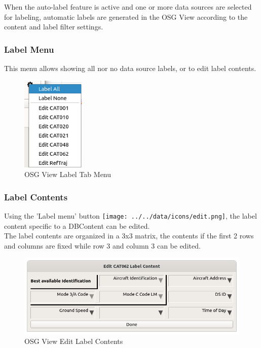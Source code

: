 When the auto-label feature is active and one or more data sources are selected for labeling, automatic labels are generated in the OSG View according to the content and label filter settings. \\

\subsubsection{Label Menu}

This menu allows showing all nor no data source labels, or to edit label contents.

\begin{figure}[H]
   \center
    \includegraphics[width=3cm,frame]{figures/osgview_label_tab_menu.png}
  \caption{OSG View Label Tab Menu}
\end{figure}

\subsubsection{Label Contents}

Using the 'Label menu' button \texttt{[image: ../../data/icons/edit.png]}, the label content specific to a DBContent can be edited. \\

The label contents are organized in a 3x3 matrix, the contents if the first 2 rows and columns are fixed while row 3 and column 3 can be edited. 

\begin{figure}[H]
   \center
    \includegraphics[width=14cm]{figures/osgview_label_content_edit.png}
  \caption{OSG View Edit Label Contents}
\end{figure}

